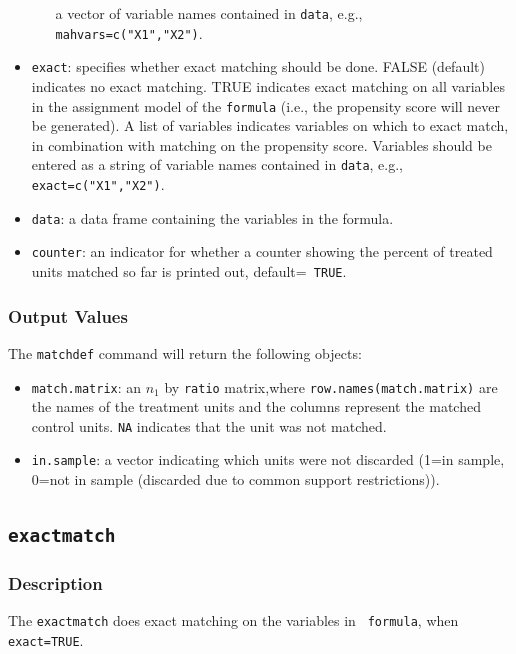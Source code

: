 \documentclass[oneside,letterpaper,titlepage]{article}
\begin{document}
\begin{appendix}
\begin{itemize}
\begin{itemize}
    a vector of variable names contained in \texttt{data}, e.g.,
    \texttt{mahvars=c("X1","X2")}.
  \end{itemize}
\item \texttt{exact}: specifies whether exact matching should be done.
  FALSE (default) indicates no exact matching.  TRUE indicates exact
  matching on all variables in the assignment model of the
  \texttt{formula} (i.e., the propensity score will never be
  generated).  A list of variables indicates variables on which to
  exact match, in combination with matching on the propensity score.
  Variables should be entered as a string of variable names contained
  in \texttt{data}, e.g., \texttt{exact=c("X1","X2")}.
\item \texttt{data}: a data frame containing the variables in the
  formula.
\item \texttt{counter}: an indicator for whether a counter showing the
  percent of treated units matched so far is printed out, default={\tt
    TRUE}.
\end{itemize}


\subsubsection{Output Values}
The \texttt{matchdef} command will return the following objects:

\begin{itemize}
\item \texttt{match.matrix}: an $n_1$ by \texttt{ratio} matrix,where
  \texttt{row.names(match.matrix)} are the names of the
  treatment units and the columns represent the matched control units.
  \texttt{NA} indicates that the unit was not matched.
\item \texttt{in.sample}: a vector indicating which units were not discarded
  (1=in sample, 0=not in sample (discarded due to common support
  restrictions)).
\end{itemize}

\subsection{\texttt{exactmatch}}

\subsubsection{Description}
The \texttt{exactmatch} does exact matching on the variables in {\tt
  formula}, when {\tt exact=TRUE}.


\end{appendix}
\end{document}
